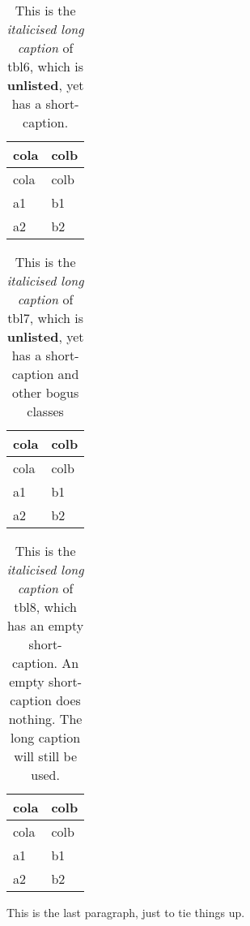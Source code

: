 \documentclass[
]{article}
\begin{document}
\undef\pandoctableshortcapt

\def\pandoctableshortcapt{}  %

\hypertarget{tbl:tbl-label6}{}
\begin{longtable}[]{@{}ll@{}}
\caption{\label{tbl:tbl-label6}This is the \emph{italicised long
caption} of tbl6, which is \textbf{unlisted}, yet has a
short-caption.}\tabularnewline
\toprule
cola & colb\tabularnewline
\midrule
\endfirsthead
\toprule
cola & colb\tabularnewline
\midrule
\endhead
a1 & b1\tabularnewline
a2 & b2\tabularnewline
\bottomrule
\end{longtable}

\undef\pandoctableshortcapt

\def\pandoctableshortcapt{}  %

\hypertarget{tbl:tbl-label7}{}
\begin{longtable}[]{@{}ll@{}}
\caption{\label{tbl:tbl-label7}This is the \emph{italicised long
caption} of tbl7, which is \textbf{unlisted}, yet has a short-caption
and other bogus classes}\tabularnewline
\toprule
cola & colb\tabularnewline
\midrule
\endfirsthead
\toprule
cola & colb\tabularnewline
\midrule
\endhead
a1 & b1\tabularnewline
a2 & b2\tabularnewline
\bottomrule
\end{longtable}

\undef\pandoctableshortcapt

\hypertarget{tbl:tbl-label8}{}
\begin{longtable}[]{@{}ll@{}}
\caption{\label{tbl:tbl-label8}This is the \emph{italicised long
caption} of tbl8, which has an empty short-caption. An empty
short-caption does nothing. The long caption will still be
used.}\tabularnewline
\toprule
cola & colb\tabularnewline
\midrule
\endfirsthead
\toprule
cola & colb\tabularnewline
\midrule
\endhead
a1 & b1\tabularnewline
a2 & b2\tabularnewline
\bottomrule
\end{longtable}

This is the last paragraph, just to tie things up.
\end{document}
